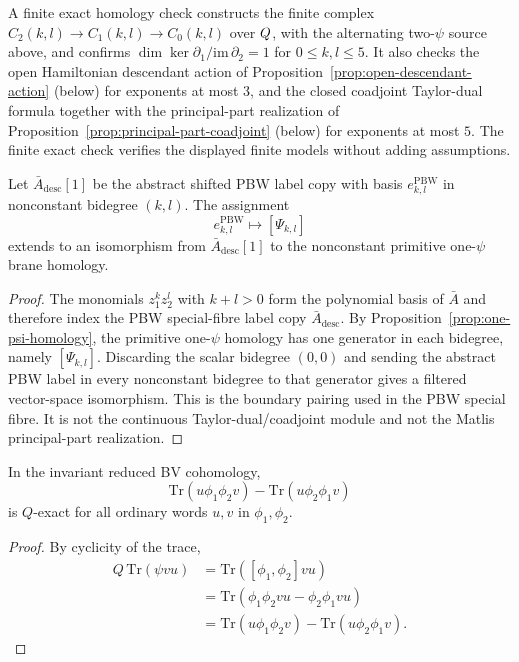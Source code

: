 \documentclass[11pt]{memoir}
\begin{document}
\begin{rmk}
  A finite exact homology check constructs the
  finite complex $C_2(k,l)\to C_1(k,l)\to C_0(k,l)$ over $Q$, with the
  alternating two-$\psi$ source above, and confirms
  $\dim\ker\partial_1/\mathrm{im}\,\partial_2=1$ for $0\leq k,l\leq5$. It
  also checks the open Hamiltonian descendant action of
  Proposition~\ref{prop:open-descendant-action} (below) for exponents at most
  $3$, and the closed coadjoint Taylor-dual formula together with the
  principal-part realization of Proposition~\ref{prop:principal-part-coadjoint}
  (below) for exponents at most $5$. The finite exact check verifies the displayed
  finite models without adding assumptions.
\end{rmk}

\begin{cor}\label{cor:cotangent-boundary-pairing}
  Let $\bar A_{\mathrm{desc}}[1]$ be the abstract shifted PBW label copy
  with basis $e^{\mathrm{PBW}}_{k,l}$ in nonconstant bidegree $(k,l)$.
  The assignment
  $$e^{\mathrm{PBW}}_{k,l}\longmapsto [\Psi_{k,l}]$$
  extends to an isomorphism from $\bar A_{\mathrm{desc}}[1]$ to the
  nonconstant primitive one-$\psi$ brane homology.
\end{cor}

\begin{proof}
  The monomials $z_1^kz_2^l$ with $k+l>0$ form the polynomial basis of
  $\bar A$ and therefore index the PBW special-fibre label copy
  $\bar A_{\mathrm{desc}}$. By
  Proposition~\ref{prop:one-psi-homology}, the primitive one-$\psi$ homology has
  one generator in each bidegree, namely $[\Psi_{k,l}]$. Discarding the scalar
  bidegree $(0,0)$ and sending the abstract PBW label in every nonconstant
  bidegree to that generator gives a filtered vector-space isomorphism. This is
  the boundary pairing used in the PBW special fibre. It is not the
  continuous Taylor-dual/coadjoint module and not the Matlis principal-part
  realization.
\end{proof}

\begin{lem}\label{lem:adjacent-swaps}
  In the invariant reduced BV cohomology,
  $$\mathrm{Tr}(u\phi_1\phi_2v)-\mathrm{Tr}(u\phi_2\phi_1v)$$
  is $Q$-exact for all ordinary words \(u,v\) in \(\phi_1,\phi_2\).
\end{lem}

\begin{proof}
  By cyclicity of the trace,
  \begin{align*}
  Q\,\mathrm{Tr}(\psi vu)
    &=\mathrm{Tr}([\phi_1,\phi_2]vu)\\
    &=\mathrm{Tr}(\phi_1\phi_2vu-\phi_2\phi_1vu)\\
    &=\mathrm{Tr}(u\phi_1\phi_2v)-\mathrm{Tr}(u\phi_2\phi_1v).
  \end{align*}
\end{proof}
\end{document}

